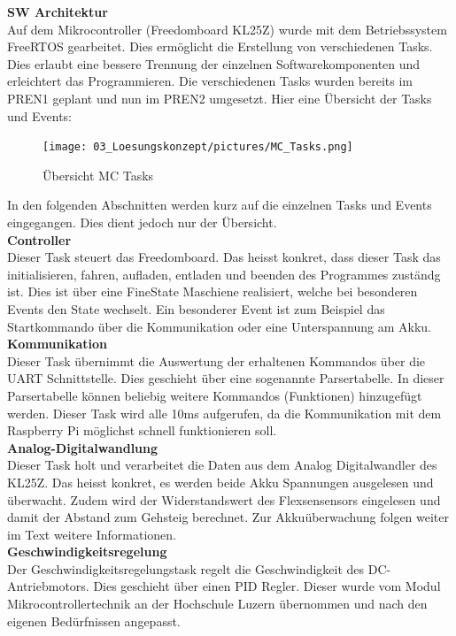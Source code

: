 \textbf{SW Architektur}\\[0.2cm]
Auf dem Mikrocontroller (Freedomboard KL25Z) wurde mit dem Betriebssystem FreeRTOS gearbeitet. Dies ermöglicht die Erstellung von verschiedenen Tasks. Dies erlaubt eine bessere Trennung der einzelnen Softwarekomponenten und erleichtert das Programmieren. Die verschiedenen Tasks wurden bereits im PREN1 geplant und nun im PREN2 umgesetzt. 
Hier eine Übersicht der Tasks und Events:

\begin{figure}[H]
	\centering
	\texttt{[image: 03\_Loesungskonzept/pictures/MC\_Tasks.png]}
	\caption{Übersicht MC Tasks}
\end{figure}
In den folgenden Abschnitten werden kurz auf die einzelnen Tasks und Events eingegangen. Dies dient jedoch nur der Übersicht.\\
\textbf{Controller}\\[0.2cm]
Dieser Task steuert das Freedomboard. Das heisst konkret, dass dieser Task das initialisieren, fahren, aufladen, entladen  und beenden des Programmes zuständg ist. Dies ist über eine FineState Maschiene realisiert, welche bei besonderen Events den State wechselt. Ein besonderer Event ist zum Beispiel das Startkommando über die Kommunikation oder eine Unterspannung am Akku.\\[0.2cm]
\textbf{Kommunikation}\\[0.2cm]
Dieser Task übernimmt die Auswertung der erhaltenen Kommandos über die UART Schnittstelle. Dies geschieht über eine sogenannte Parsertabelle. In dieser Parsertabelle können beliebig weitere Kommandos (Funktionen) hinzugefügt werden. Dieser Task wird alle 10ms aufgerufen, da die Kommunikation mit dem Raspberry Pi möglichst schnell funktionieren soll.\\[0.2cm]
\textbf{Analog-Digitalwandlung}\\[0.2cm]
Dieser Task holt und verarbeitet die Daten aus dem Analog Digitalwandler des KL25Z. Das heisst konkret, es werden beide Akku Spannungen ausgelesen und überwacht. Zudem wird der Widerstandswert des Flexsensensors eingelesen und damit der Abstand zum Gehsteig berechnet. Zur Akkuüberwachung folgen weiter im Text weitere Informationen.\\[0.2cm]
\textbf{Geschwindigkeitsregelung}\\[0.2cm]
Der Geschwindigkeitsregelungstask regelt die Geschwindigkeit des DC-Antriebmotors. Dies geschieht über einen PID Regler. Dieser wurde vom Modul Mikrocontrollertechnik an der Hochschule Luzern übernommen und nach den eigenen Bedürfnissen angepasst.\\[0.2cm]
